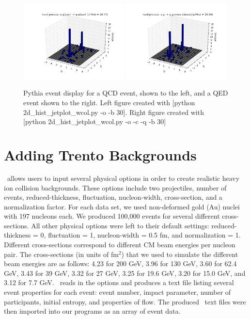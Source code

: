 \documentclass[11pt]{article}
\begin{document}
\begin{figure}[h]
\begin{center}
\includegraphics[width=0.49\textwidth]{2d_hist_jetplot.png}
\includegraphics[width=0.49\textwidth]{2d_hist_jetplot2.png}
\label{fig_label}
\caption{Pythia event display for a QCD event, shown to the left, and a QED event shown to the right.  Left figure created with [python 2d\_hist\_jetplot\_wcol.py -o -b 30]. Right figure created with [python 2d\_hist\_jetplot\_wcol.py -o -c -q -b 30]}
\end{center}
\end{figure}

\section{Adding Trento Backgrounds}
%
%
\trento\ allows users to input several physical options in order to create realistic heavy ion collision backgrounds. These options include two projectiles, number of events, reduced-thickness, fluctuation, nucleon-width, cross-section, and a normalization factor. For each data set,  we used non-deformed gold (Au) nuclei with 197 nucleons each. We produced 100,000 events for several different cross-sections. All other physical options were left to their default settings: reduced-thickness = 0, fluctuation = 1, nucleon-width = 0.5 fm, and normalization = 1. Different cross-sections correspond to different CM beam energies per nucleon pair. The cross-sections (in units of fm$^2$) that we used to simulate the different beam energies are as follows: 4.23 for 200 GeV, 3.96 for 130 GeV, 3.60 for 62.4 GeV, 3.43 for 39 GeV, 3.32 for 27 GeV, 3.25 for 19.6 GeV, 3.20 for 15.0 GeV, and 3.12 for 7.7 GeV. \trento\ reads in the options and produces a text file listing several event properties for each event: event number, impact parameter, number of participants, initial entropy, and properties of flow. The produced \trento\ text files were then imported into our programs as an array of event data.
\end{document}
